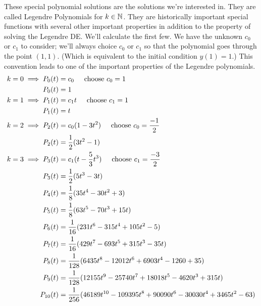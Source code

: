 \documentclass[fleqn,letterpaper]{report}
\begin{document}
These special polynomial solutions are the solutions we're
interested in. They are called Legendre Polynomials for $k
\in \mathbb{N}$. They are historically important special functions
with several other important
properties in addition to the property of solving the Legendre
DE. We'll calculate the first few. We have the unknown
$c_0$ or $c_1$ to consider; we'll always choice $c_0$ or $c_1$
so that the polynomial goes through the point $(1,1)$. (Which
is equivalent to the initial condition $y(1) = 1$.) This
convention leads to one of the important properties of
the Legendre polynomials. 
\begin{align*}
k=0 \implies P_0(t) & = c_0 \hspace{0.5cm} \text{choose } c_0 = 1 \\
P_0(t) & = 1 \\
k=1 \implies P_1(t) & = c_1t \hspace{0.5cm} \text{choose } c_1 = 1 \\
P_1(t) & = t \\
k=2 \implies P_2(t) & = c_0 (1 - 3t^2) \hspace{0.5cm}
\text{choose } c_0 = \frac{-1}{2} \\ P_2(t) & = \frac{1}{2} (3t^2 -1) \\
k=3 \implies P_3(t) & = c_1 (t - \frac{5}{3}t^3) \hspace{0.5cm}
\text{choose } c_1 = \frac{-3}{2} \\ P_3(t) & = \frac{1}{2}
(5t^3 -3t ) \\
P_4(t) & = \frac{1}{8} (35t^4 - 30 t^2 + 3) \\
P_5(t) & = \frac{1}{8} (63t^5 - 70t^3 + 15t) \\
P_6(t) & = \frac{1}{16} (231t^6 - 315t^4 + 105t^2 - 5) \\
P_7(t) & = \frac{1}{16} (429t^7 - 693t^5 + 315t^3 - 35t) \\
P_8(t) & = \frac{1}{128} (6435t^8 - 12012t^6 + 6903t^4 - 1260 +
35) \\
P_9(t) & = \frac{1}{128} (12155t^9 - 25740t^7 + 18018t^5 -
4620t^3 + 315t) \\
P_{10}(t) & = \frac{1}{256} (46189t^{10} - 109395t^8 + 90090t^6 -
30030t^4 + 3465t^2 - 63) 
\end{align*}
\end{document}
